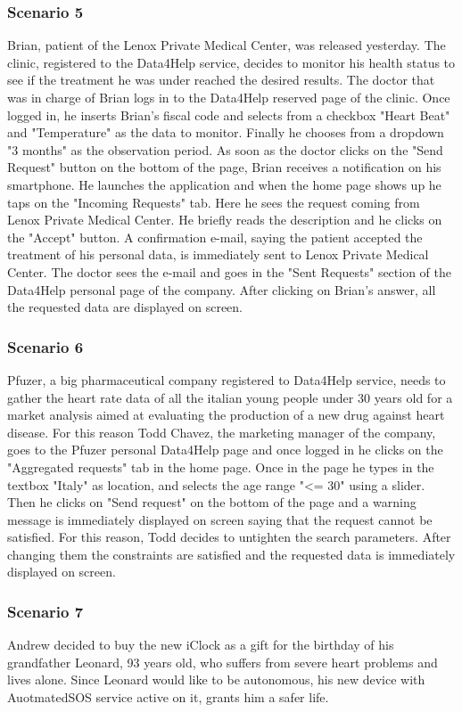 \subsubsection{Scenario 5}
Brian, patient of the Lenox Private Medical Center, was released  yesterday. The clinic, registered to the Data4Help service, decides to monitor his health status to see if the treatment he was under reached the desired results.
The doctor that was in charge of Brian logs in to the Data4Help reserved page of the clinic. Once logged in, he inserts Brian's fiscal code and selects from a checkbox "Heart Beat" and "Temperature" as the data to monitor. Finally he chooses from a dropdown "3 months" as the observation period.
As soon as the doctor clicks on the "Send Request" button on the bottom of the page, Brian receives a notification on his smartphone. He launches the application and when the home page shows up he taps on the "Incoming Requests" tab. Here he sees the request coming from Lenox Private Medical Center. He briefly reads the description and he clicks on the "Accept" button. A confirmation e-mail, saying the patient accepted the treatment of his personal data, is immediately sent to Lenox Private Medical Center.
The doctor sees the e-mail and goes in the "Sent Requests" section of the Data4Help personal page of the company. After clicking on Brian's answer, all the requested data are displayed on screen.
\subsubsection{Scenario 6}
Pfuzer, a big pharmaceutical company registered to Data4Help service, needs to gather the heart rate data of all the italian young people under 30 years old for a market analysis aimed at evaluating the production of a new drug against heart disease. For this reason Todd Chavez, the marketing manager of the company, goes to the Pfuzer personal Data4Help page and once logged  in he clicks on the "Aggregated requests" tab in the home page. Once in the page he types in the textbox "Italy" as location, and selects the age range "<= 30" using a slider. Then he clicks on "Send request" on the bottom of the page and a warning message is immediately displayed on screen saying that the request cannot be satisfied. For this reason, Todd decides to untighten the search parameters. After changing them the constraints are satisfied and the requested data is immediately displayed on screen.
\subsubsection{Scenario 7}
Andrew decided to buy the new iClock as a gift for the birthday of his grandfather Leonard, 93 years old, who suffers from severe heart problems and lives alone. Since Leonard would like to be autonomous, his new device with AuotmatedSOS service active on it, grants him a safer life.


